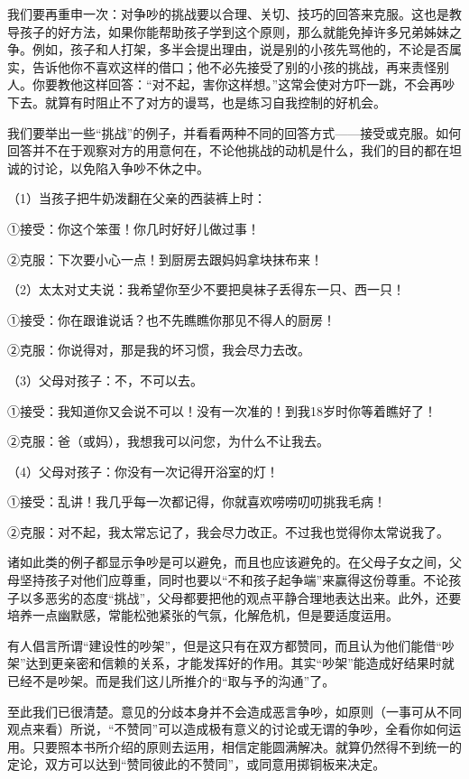 \documentclass[12pt,UTF8]{ctexbook}
\begin{document}
我们要再重申一次：对争吵的挑战要以合理、关切、技巧的回答来克服。这也是教导孩子的好方法，如果你能帮助孩子学到这个原则，那么就能免掉许多兄弟姊妹之争。例如，孩子和人打架，多半会提出理由，说是别的小孩先骂他的，不论是否属实，告诉他你不喜欢这样的借口；他不必先接受了别的小孩的挑战，再来责怪别人。你要教他这样回答：“对不起，害你这样想。”这常会使对方吓一跳，不会再吵下去。就算有时阻止不了对方的谩骂，也是练习自我控制的好机会。

我们要举出一些“挑战”的例子，并看看两种不同的回答方式——接受或克服。如何回答并不在于观察对方的用意何在，不论他挑战的动机是什么，我们的目的都在坦诚的讨论，以免陷入争吵不休之中。

（1）当孩子把牛奶泼翻在父亲的西装裤上时：

①接受：你这个笨蛋！你几时好好儿做过事！

②克服：下次要小心一点！到厨房去跟妈妈拿块抹布来！

（2）太太对丈夫说：我希望你至少不要把臭袜子丢得东一只、西一只！

①接受：你在跟谁说话？也不先瞧瞧你那见不得人的厨房！

②克服：你说得对，那是我的坏习惯，我会尽力去改。

（3）父母对孩子：不，不可以去。

①接受：我知道你又会说不可以！没有一次准的！到我18岁时你等着瞧好了！

②克服：爸（或妈），我想我可以问您，为什么不让我去。

（4）父母对孩子：你没有一次记得开浴室的灯！

①接受：乱讲！我几乎每一次都记得，你就喜欢唠唠叨叨挑我毛病！

②克服：对不起，我太常忘记了，我会尽力改正。不过我也觉得你太常说我了。

诸如此类的例子都显示争吵是可以避免，而且也应该避免的。在父母子女之间，父母坚持孩子对他们应尊重，同时也要以“不和孩子起争端”来赢得这份尊重。不论孩子以多恶劣的态度“挑战”，父母都要把他的观点平静合理地表达出来。此外，还要培养一点幽默感，常能松弛紧张的气氛，化解危机，但是要适度运用。

有人倡言所谓“建设性的吵架”，但是这只有在双方都赞同，而且认为他们能借“吵架”达到更亲密和信赖的关系，才能发挥好的作用。其实“吵架”能造成好结果时就已经不是吵架。而是我们这儿所推介的“取与予的沟通”了。

至此我们已很清楚。意见的分歧本身并不会造成恶言争吵，如原则（一事可从不同观点来看）所说，“不赞同”可以造成极有意义的讨论或无谓的争吵，全看你如何运用。只要照本书所介绍的原则去运用，相信定能圆满解决。就算仍然得不到统一的定论，双方可以达到“赞同彼此的不赞同”，或同意用掷铜板来决定。
\end{document}
